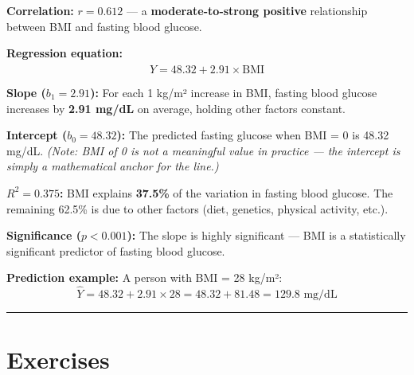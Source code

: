 \documentclass[
  12pt,
  letterpaper,
]{book}
\begin{document}
\begin{tcolorbox}[enhanced jigsaw, arc=.35mm, bottomrule=.15mm, bottomtitle=1mm, breakable, colback=white, colbacktitle=quarto-callout-tip-color!10!white, colframe=quarto-callout-tip-color-frame, coltitle=black, left=2mm, leftrule=.75mm, opacityback=0, opacitybacktitle=0.6, rightrule=.15mm, title={✅ Interpretation}, titlerule=0mm, toprule=.15mm, toptitle=1mm]

\textbf{Correlation:} \(r = 0.612\) --- a \textbf{moderate-to-strong
positive} relationship between BMI and fasting blood glucose.

\textbf{Regression equation:}
\[\hat{Y} = 48.32 + 2.91 \times \text{BMI}\]

\textbf{Slope (\(b_1 = 2.91\)):} For each 1 kg/m² increase in BMI,
fasting blood glucose increases by \textbf{2.91 mg/dL} on average,
holding other factors constant.

\textbf{Intercept (\(b_0 = 48.32\)):} The predicted fasting glucose when
BMI = 0 is 48.32 mg/dL. \emph{(Note: BMI of 0 is not a meaningful value
in practice --- the intercept is simply a mathematical anchor for the
line.)}

\textbf{\(R^2 = 0.375\):} BMI explains \textbf{37.5\%} of the variation
in fasting blood glucose. The remaining 62.5\% is due to other factors
(diet, genetics, physical activity, etc.).

\textbf{Significance (\(p < 0.001\)):} The slope is highly significant
--- BMI is a statistically significant predictor of fasting blood
glucose.

\textbf{Prediction example:} A person with BMI = 28 kg/m²:
\[\hat{Y} = 48.32 + 2.91 \times 28 = 48.32 + 81.48 = 129.8 \text{ mg/dL}\]

\end{tcolorbox}

\begin{center}\rule{0.5\linewidth}{0.5pt}\end{center}


\chapter{Exercises}\label{exercises-5}
\end{document}
